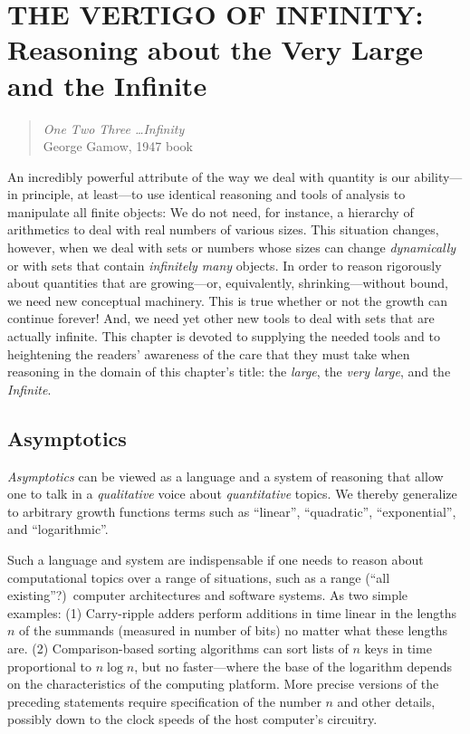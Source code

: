 
\chapter{THE VERTIGO OF INFINITY: \\
Reasoning about the Very Large and the Infinite}
\label{ch:infinity}

\begin{quote}
{\em One Two Three \ldots Infinity} \\
\hspace*{1in}George Gamow, 1947 book
\end{quote}

\noindent
An incredibly powerful attribute of the way we deal with quantity is
our ability---in principle, at least---to use identical reasoning and
tools of analysis to manipulate all finite objects: We do not need,
for instance, a hierarchy of arithmetics to deal with real numbers of
various sizes.  This situation changes, however, when we deal with
sets or numbers whose sizes can change {\em dynamically} or with sets
that contain {\em infinitely many} objects.  In order to reason
rigorously about quantities that are growing---or, equivalently,
shrinking---without bound, we need new conceptual machinery.  This is
true whether or not the growth can continue forever!  And, we need yet
other new tools to deal with sets that are actually infinite.  This
chapter is devoted to supplying the needed tools and to heightening
the readers' awareness of the care that they must take when reasoning
in the domain of this chapter's title: the {\em large}, the {\em very
  large}, and the {\em Infinite}.



\section{Asymptotics}
\label{sec:asymptotics}

{\em Asymptotics}  can be viewed as a language and
a system of reasoning that allow one to talk in a {\em qualitative}
voice about {\em quantitative} topics.  We thereby generalize to
arbitrary growth functions terms such as ``linear'', ``quadratic'',
``exponential'', and ``logarithmic''.

Such a language and system are indispensable if one needs to reason
about computational topics over a range of situations, such as a range
(``all existing''?)~computer architectures and software systems.  As
two simple examples: (1) Carry-ripple adders perform additions in time
linear in the lengths $n$ of the summands (measured in number of bits)
no matter what these lengths are. (2) Comparison-based sorting
algorithms can sort lists of $n$ keys in time proportional to $n \log
n$, but no faster---where the base of the logarithm depends on the
characteristics of the computing platform.  More precise versions of
the preceding statements require specification of the number $n$ and
other details, possibly down to the clock speeds of the host
computer's circuitry.


